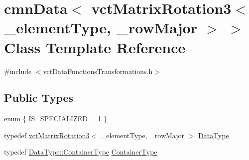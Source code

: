 \hypertarget{classcmn_data_3_01vct_matrix_rotation3_3_01__element_type_00_01__row_major_01_4_01_4}{}\section{cmn\+Data$<$ vct\+Matrix\+Rotation3$<$ \+\_\+element\+Type, \+\_\+row\+Major $>$ $>$ Class Template Reference}
\label{classcmn_data_3_01vct_matrix_rotation3_3_01__element_type_00_01__row_major_01_4_01_4}


{\ttfamily \#include $<$vct\+Data\+Functions\+Transformations.\+h$>$}

\subsection*{Public Types}
\begin{DoxyCompactItemize}
\item 
enum \{ \hyperlink{classcmn_data_3_01vct_matrix_rotation3_3_01__element_type_00_01__row_major_01_4_01_4_a15b6e2a571428292a28e53b16ef04b9baebd0311ce7a9504d1e214752ee6778eb}{I\+S\+\_\+\+S\+P\+E\+C\+I\+A\+L\+I\+Z\+E\+D} = 1
 \}
\item 
typedef \hyperlink{classvct_matrix_rotation3}{vct\+Matrix\+Rotation3}$<$ \+\_\+element\+Type, \+\_\+row\+Major $>$ \hyperlink{classcmn_data_3_01vct_matrix_rotation3_3_01__element_type_00_01__row_major_01_4_01_4_a16ee28dba714864959664e5a1567db82}{Data\+Type}
\item 
typedef \hyperlink{classvct_matrix_rotation3_a1f8796d5368dbda35c3b57c6395b6dd0}{Data\+Type\+::\+Container\+Type} \hyperlink{classcmn_data_3_01vct_matrix_rotation3_3_01__element_type_00_01__row_major_01_4_01_4_a220f0a68d567275fede9e0124441ae86}{Container\+Type}
\end{DoxyCompactItemize}

